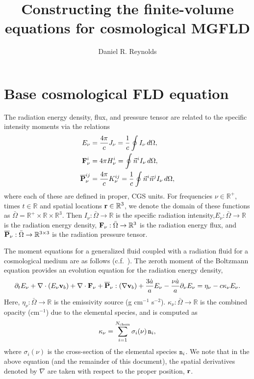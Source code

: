 \documentclass[10pt]{article}
\author{Daniel R. Reynolds}
\title{Constructing the finite-volume equations for cosmological MGFLD}
\renewcommand{\(}{\left(}
\renewcommand{\)}{\right)}
\newcommand{\vb}{{\bf v}_b}
\newcommand{\rvec}{{\bf r}}
\newcommand{\Omegabar}{\bar{\Omega}}
\newcommand{\adot}{\dot{a}}
\newcommand{\Enu}{E_{\nu}}
\newcommand{\Fnu}{{\bf F}_{\nu}}
\newcommand{\Pnu}{\overline{\bf P}_{\nu}}
\newcommand{\R}{\mathbb{R}}
\newcommand{\Rthree}{\R^3}
\newcommand{\mn}{{\tt n}}
\begin{document}
\maketitle


\section{Base cosmological FLD equation}
\label{sec:PDE}

The radiation energy density, flux, and pressure tensor are related
to the specific intensity moments via the relations
\begin{align}
  \label{eq:density_wrt_intensity}
  \Enu &= \frac{4\pi}{c} J_{\nu} = \frac1c \oint I_{\nu} \,d\Omega, \\
  \label{eq:flux_wrt_intensity}
  \Fnu^i &= 4 \pi H^i_{\nu} = \oint \vec{n}^i I_{\nu} \,d\Omega, \\
  \label{eq:pressure_wrt_intensity}
  \Pnu^{ij} &= \frac{4\pi}{c} K^{ij}_\nu = \frac1c \oint \vec{n}^i
    \vec{n}^j I_{\nu} \,d\Omega,
\end{align}
where each of these are defined in proper, CGS units.  
For frequencies $\nu\in\R^+$, times $t\in\R$ and spatial locations
$\rvec\in\R^3$, we denote the domain of these functions as $\Omegabar
= \R^+\times\R\times\R^3$. Then $I_{\nu}:\Omegabar\rightarrow\R$ is
the specific radiation intensity,$\Enu:\Omegabar\rightarrow\R$ is the
radiation energy density, $\Fnu:\Omegabar\rightarrow\Rthree$ is the
radiation energy flux, and $\Pnu:\Omegabar\rightarrow\R^{3\times 3}$
is the radiation pressure tensor. 

The moment equations for a generalized fluid coupled with a radiation
fluid for a cosmological medium are as follows
(c.f.~\cite{HayesNorman2003,Paschos2005}).  The zeroth moment of the 
Boltzmann equation provides an evolution equation for the radiation
energy density,
\begin{equation}
\label{eq:zero_mom}
  \partial_{t} E_{\nu} + \nabla\cdot(\Enu\vb) 
    + \nabla\cdot\Fnu + \Pnu:(\nabla\vb) + \frac{3\adot}{a}\Enu -
    \frac{\nu\adot}{a}\partial_{\nu} \Enu
  = \eta_{\nu} -c \kappa_{\nu} \Enu.
\end{equation}
Here, $\eta_{\nu}:\Omegabar\rightarrow\R$ is the emissivity source
(g cm$^{-1}$ s$^{-2}$).  $\kappa_{\nu}:\Omegabar\rightarrow\R$ is the
combined opacity (cm$^{-1}$) due to the elemental species, and is
computed as 
\begin{equation}
\label{eq:opacity_def}
  \kappa_{\nu} = \sum_{i=1}^{N_\text{chem}} \sigma_{i}(\nu)\,\mn_i,
\end{equation}
where $\sigma_i(\nu)$ is the cross-section of the elemental species
$\mn_i$.  We note that in the above equation (and the remainder of
this document), the spatial derivatives denoted by $\nabla$ are taken
with respect to the proper position, $\rvec$.
\end{document}
